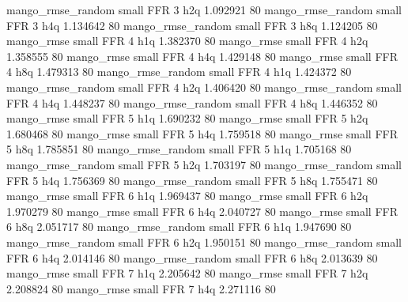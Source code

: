 mango_rmse_random      small      FFR                 3                  h2q 1.092921 80
mango_rmse_random      small      FFR                 3                  h4q 1.134642 80
mango_rmse_random      small      FFR                 3                  h8q 1.124205 80
       mango_rmse      small      FFR                 4                  h1q 1.382370 80
       mango_rmse      small      FFR                 4                  h2q 1.358555 80
       mango_rmse      small      FFR                 4                  h4q 1.429148 80
       mango_rmse      small      FFR                 4                  h8q 1.479313 80
mango_rmse_random      small      FFR                 4                  h1q 1.424372 80
mango_rmse_random      small      FFR                 4                  h2q 1.406420 80
mango_rmse_random      small      FFR                 4                  h4q 1.448237 80
mango_rmse_random      small      FFR                 4                  h8q 1.446352 80
       mango_rmse      small      FFR                 5                  h1q 1.690232 80
       mango_rmse      small      FFR                 5                  h2q 1.680468 80
       mango_rmse      small      FFR                 5                  h4q 1.759518 80
       mango_rmse      small      FFR                 5                  h8q 1.785851 80
mango_rmse_random      small      FFR                 5                  h1q 1.705168 80
mango_rmse_random      small      FFR                 5                  h2q 1.703197 80
mango_rmse_random      small      FFR                 5                  h4q 1.756369 80
mango_rmse_random      small      FFR                 5                  h8q 1.755471 80
       mango_rmse      small      FFR                 6                  h1q 1.969437 80
       mango_rmse      small      FFR                 6                  h2q 1.970279 80
       mango_rmse      small      FFR                 6                  h4q 2.040727 80
       mango_rmse      small      FFR                 6                  h8q 2.051717 80
mango_rmse_random      small      FFR                 6                  h1q 1.947690 80
mango_rmse_random      small      FFR                 6                  h2q 1.950151 80
mango_rmse_random      small      FFR                 6                  h4q 2.014146 80
mango_rmse_random      small      FFR                 6                  h8q 2.013639 80
       mango_rmse      small      FFR                 7                  h1q 2.205642 80
       mango_rmse      small      FFR                 7                  h2q 2.208824 80
       mango_rmse      small      FFR                 7                  h4q 2.271116 80
